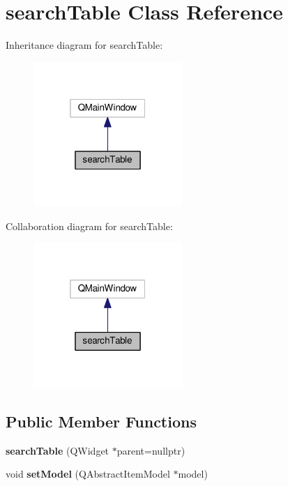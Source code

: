 \hypertarget{classsearchTable}{}\section{search\+Table Class Reference}
\label{classsearchTable}


Inheritance diagram for search\+Table\+:\nopagebreak
\begin{figure}[H]
\begin{center}
\leavevmode
\includegraphics[width=160pt]{classsearchTable__inherit__graph}
\end{center}
\end{figure}


Collaboration diagram for search\+Table\+:\nopagebreak
\begin{figure}[H]
\begin{center}
\leavevmode
\includegraphics[width=160pt]{classsearchTable__coll__graph}
\end{center}
\end{figure}
\subsection*{Public Member Functions}
\begin{DoxyCompactItemize}
\item 
{\bfseries search\+Table} (Q\+Widget $\ast$parent=nullptr)\hypertarget{classsearchTable_ab233ee8fd30c334c2261d4ac283ef543}{}\label{classsearchTable_ab233ee8fd30c334c2261d4ac283ef543}

\item 
void {\bfseries set\+Model} (Q\+Abstract\+Item\+Model $\ast$model)\hypertarget{classsearchTable_ad0c91555aa841bd340407532288e4e03}{}\label{classsearchTable_ad0c91555aa841bd340407532288e4e03}

\end{DoxyCompactItemize}


